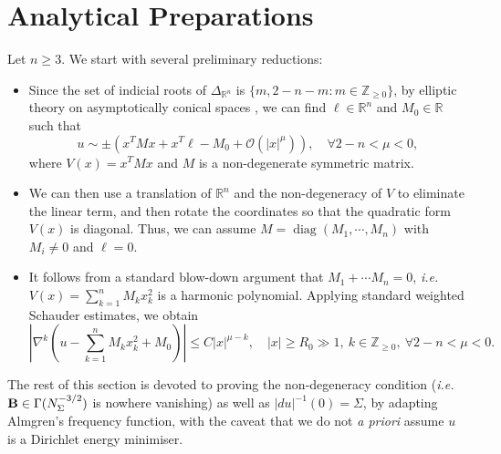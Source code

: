 \documentclass[11pt,a4paper]{article}
\numberwithin{equation}{section}%
\theoremstyle{definition}
\newcommand{\ie}{\emph{i.e.} }
\newcommand{\R}{\mathbb{R}}
\newcommand{\Z}{\mathbb{Z}}
\begin{document}
\section{Analytical Preparations}
\label{Sec:analyticalpreparations}
Let $n\geqslant 3$.
We start with several preliminary reductions:
\begin{itemize}
    \item Since the set of indicial roots of $\Delta_{\R^n}$ is $\{m,2-n-m:m\in \Z_{\geqslant0}\}$, by elliptic theory on asymptotically conical spaces \cite{Lockhart-McOwen}, we can find $\ell \in \R^n$ and $M_0\in \R$ such that 
    $$u\sim \pm\left({x^TMx}+x^T\ell-M_0+\mathcal{O}(|x|^{\mu})\right),\quad \forall 2-n<\mu<0,$$
    where $V(x)=x^TMx$ and $M$ is a non-degenerate symmetric matrix.  
    \item We can then use a translation of $\R^n$ and the non-degeneracy of $V$ to eliminate the linear term, and then rotate the coordinates so that the quadratic form $V(x)$ is diagonal. Thus, we can assume $M=\operatorname{diag}(M_1,\cdots,M_n)$ with $M_i\neq 0$ and $\ell=0$. 
    \item It follows from a standard blow-down argument that $M_1+\cdots M_n=0$, \ie $V(x)=\sum\limits_{k=1}^n M_kx_k^2$ is a harmonic polynomial. Applying standard weighted Schauder estimates, we obtain
   \begin{equation}
       \label{eqn:higher-order derivative estimates}
       \left|\nabla^k\left(u-\sum_{k=1}^n M_kx_k^2+M_0\right)\right|\leqslant C |x|^{\mu-k},\quad |x|\geqslant R_0\gg1,~k\in \Z_{\geqslant 0},~\forall 2-n<\mu<0.
   \end{equation}
 
\end{itemize}

The rest of this section is devoted to proving the non-degeneracy condition (\ie ${\bf B}\in \Gamma(N_\Sigma^{-3/2})$ is nowhere vanishing)  as well as $|du|^{-1}(0)=\Sigma$, by adapting Almgren's frequency function, with the caveat that we do not \textit{a priori} assume $u$ is a Dirichlet energy minimiser. 
\end{document}
